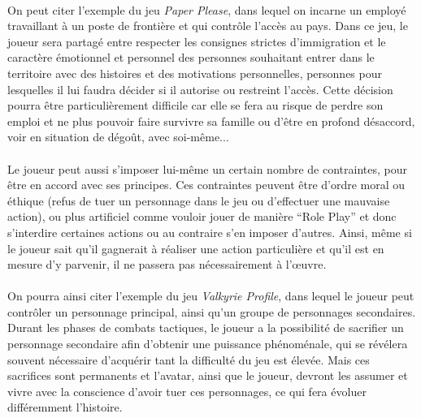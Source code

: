  \paragraph{}
On peut citer l’exemple du jeu \emph{Paper Please}, dans lequel on incarne un employé travaillant à un poste de frontière et qui contrôle l’accès au pays. Dans ce jeu, le joueur sera partagé entre respecter les consignes strictes d’immigration et le caractère émotionnel et personnel des personnes souhaitant entrer dans le territoire avec des histoires et des motivations personnelles, personnes pour lesquelles il lui faudra décider si il autorise ou restreint l’accès. Cette décision pourra être particulièrement difficile car elle se fera au risque de perdre son emploi et ne plus pouvoir faire survivre sa famille ou d’être en profond désaccord, voir en situation de dégoût, avec soi-même...\paragraph{}
Le joueur peut aussi s’imposer lui-même un certain nombre de contraintes, pour être en accord avec ses principes. Ces contraintes peuvent être d’ordre moral ou éthique (refus de tuer un personnage dans le jeu ou d’effectuer une mauvaise action), ou plus artificiel comme vouloir jouer de manière “Role Play” et donc s’interdire certaines actions ou au contraire s’en imposer d’autres. Ainsi, même si le joueur sait qu’il gagnerait à réaliser une action particulière et qu’il est en mesure d’y parvenir, il ne passera pas nécessairement à l’œuvre. 
\paragraph{}On pourra ainsi citer l’exemple du jeu \emph{Valkyrie Profile}, dans lequel le joueur peut contrôler un personnage principal, ainsi qu’un groupe de personnages secondaires. Durant les phases de combats tactiques, le joueur a la possibilité de sacrifier un personnage secondaire afin d’obtenir une puissance phénoménale, qui se révélera souvent nécessaire d’acquérir tant la difficulté du jeu est élevée. Mais ces sacrifices sont permanents et l’avatar, ainsi que le joueur, devront les assumer et vivre avec la conscience d’avoir tuer ces personnages, ce qui fera évoluer différemment l’histoire.
